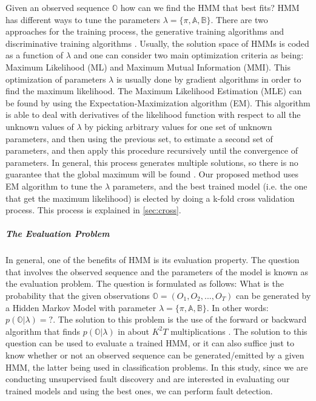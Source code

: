 Given an observed sequence $\mathbb{O}$ how can we find the HMM that best fits? HMM has different ways to tune the parameters $\lambda = \{\pi, \mathbb{A}, \mathbb{B} \}$. There are two approaches for the training process, the generative training algorithms and discriminative training algorithms \cite{dymarski2011hidden}. Usually, the solution space of HMMs is coded as a function of $\lambda$ and one can consider two main optimization criteria as being: Maximum Likelihood (ML) and Maximum Mutual Information (MMI). This optimization of parameters $\lambda$ is usually done by gradient algorithms in order to find the maximum likelihood. The Maximum Likelihood Estimation (MLE) can be found by using the Expectation-Maximization algorithm (EM). This algorithm is able to deal with derivatives of the likelihood function with respect to all the unknown values of $\lambda$ by picking arbitrary values for one set of unknown parameters, and then using the previous set, to estimate a second set of parameters, and then apply this procedure recursively until the convergence of parameters. In general, this process generates multiple solutions, so there is no guarantee that the global maximum will be found \cite{dymarski2011hidden}. Our proposed method uses EM algorithm to tune the $\lambda$ parameters, and the best trained model (i.e. the one that get the maximum likelihood) is elected by doing a k-fold cross validation process. This process is explained in \ref{sec:cross}. 


\subparagraph{The Evaluation Problem}
\label{sec:evaluation_HMM}

In general, one of the benefits of HMM is its evaluation property. The question that involves the observed sequence and the parameters of the model is known as the evaluation problem. The question is formulated as follows: What is the probability that the given observations $\mathbb{O} = (O_1,O_2, ...,O_T )$ can be generated by a Hidden Markov Model with parameter $\lambda = \{\pi, \mathbb{A}, \mathbb{B} \}$. In other words: $p(\mathbb{O}|\lambda) = ?$. The solution to this problem is the use of the forward or backward algorithm that finds $p(\mathbb{O}|\lambda)$ in about $K^{2} T$ multiplications \cite{stamp2004revealing}. The solution to this question can be used to evaluate a trained HMM, or it can also suffice just to know whether or not an observed sequence can be generated/emitted by a given HMM, the latter being used in classification problems. In this study, since we are conducting unsupervised fault discovery and are interested in evaluating our trained models and using the best ones, we can perform fault detection.



